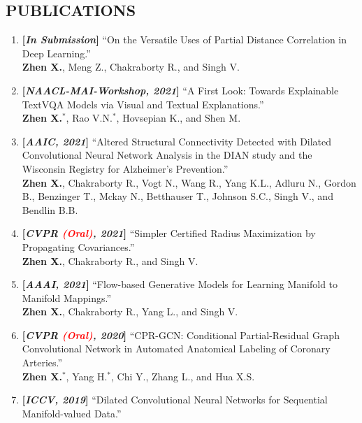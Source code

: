 \documentclass[margin]{res}
\begin{document}
\begin{resume}
\section{PUBLICATIONS}
                \begin{enumerate}[noitemsep,wide=0pt,leftmargin=\dimexpr\labelwidth + 2\labelsep\relax]\itemsep -0.0pt
                \item \textbf{[\emph{In Submission}]} ``On the Versatile Uses of Partial Distance Correlation in Deep Learning.''\\
                            \textbf{Zhen X.}, Meng Z., Chakraborty R., and Singh V.
                \item \textbf{[\emph{NAACL-MAI-Workshop, 2021}]} ``A First Look: Towards Explainable TextVQA Models via Visual and Textual Explanations.''\\
                            \textbf{Zhen X.}$^*$, Rao V.N.$^*$, Hovsepian K., and Shen M.
                \item \textbf{[\emph{AAIC, 2021}]} ``Altered Structural Connectivity Detected with Dilated Convolutional Neural Network Analysis in the DIAN study and the Wisconsin Registry for Alzheimer's Prevention.''\\
                            \textbf{Zhen X.}, Chakraborty R., Vogt N., Wang R., Yang K.L., Adluru N., Gordon B., Benzinger T., Mckay N., Betthauser T., Johnson S.C., Singh V., and Bendlin B.B.
                \item \textbf{[\emph{CVPR \textcolor{red}{(Oral)}, 2021}]} ``Simpler Certified Radius Maximization by Propagating Covariances.''\\
                            \textbf{Zhen X.}, Chakraborty R., and Singh V. 
                \item \textbf{[\emph{AAAI, 2021}]} ``Flow-based Generative Models for Learning Manifold to Manifold Mappings.''\\
                            \textbf{Zhen X.}, Chakraborty R., Yang L., and Singh V. 
                \item \textbf{[\emph{CVPR \textcolor{red}{(Oral)}, 2020}]} ``CPR-GCN: Conditional Partial-Residual Graph Convolutional Network in Automated Anatomical Labeling of Coronary Arteries.''\\
                            \textbf{Zhen X.}$^*$, Yang H.$^*$, Chi Y., Zhang L., and Hua X.S.   
                \item \textbf{[\emph{ICCV, 2019}]} ``Dilated Convolutional Neural Networks for Sequential Manifold-valued Data.'' \\

\end{enumerate}
\end{resume}
\end{document}

